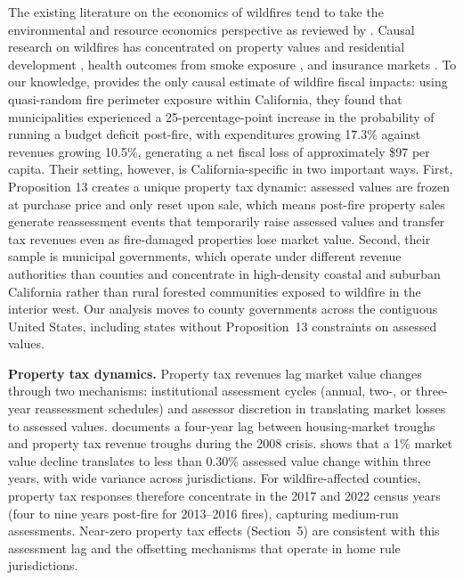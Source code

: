 \documentclass[12pt]{article}
\begin{document}
The existing literature on the economics of wildfires tend to take the environmental and resource economics 
perspective as reviewed by \citet{bayham2022}. Causal research on wildfires has concentrated on
property values and residential development \citep{baylis2023}, health outcomes
from smoke exposure \citep{borgschulte2024}, and insurance markets \citep{boomhower2023}.
To our knowledge, \citet{liao2022} provides the only causal estimate of wildfire fiscal
impacts: using quasi-random fire perimeter exposure within California, they found
that municipalities experienced a 25-percentage-point increase in the probability
of running a budget deficit post-fire, with expenditures growing 17.3\% against
revenues growing 10.5\%, generating a net fiscal loss of approximately \$97 per
capita. Their setting, however, is California-specific in two important ways.
First, Proposition 13 creates a unique property tax dynamic: assessed values are
frozen at purchase price and only reset upon sale, which means post-fire property
sales generate reassessment events that temporarily raise assessed values and
transfer tax revenues even as fire-damaged properties lose market value. Second,
their sample is municipal governments, which operate under different revenue
authorities than counties and concentrate in high-density coastal and suburban
California rather than rural forested communities exposed to wildfire in the interior
west. Our analysis moves to county governments
across the contiguous United States, including states without Proposition~13
constraints on assessed values.

\textbf{Property tax dynamics.} Property tax revenues lag market value changes through
two mechanisms: institutional assessment cycles (annual, two-, or three-year
reassessment schedules) and assessor discretion in translating market losses to
assessed values. \citet{lutz2011} documents a four-year lag between housing-market
troughs and property tax revenue troughs during the 2008 crisis.
\citet{chen2024} shows that a 1\% market value decline translates to less than
0.30\% assessed value change within three years, with wide variance across
jurisdictions. For wildfire-affected counties, property tax responses therefore
concentrate in the 2017 and 2022 census years (four to nine years post-fire for
2013--2016 fires), capturing medium-run assessments. Near-zero property tax effects
(Section~5) are consistent with this assessment lag and the offsetting mechanisms
that operate in home rule jurisdictions.
\end{document}
